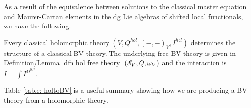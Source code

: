 \documentclass[11pt]{amsart}
\def\brian{\textcolor{blue}{BW: }\textcolor{blue}}
\begin{document}
As a result of the equivalence between solutions to the classical master equation and Maurer-Cartan elements in the dg Lie algebras of shifted local functionals, we have the following. 

\begin{prop} Every classical holomorphic theory $(V, Q^{hol},(-,-)_V, I^{hol})$ determines the structure of a classical BV theory.
The underlying free BV theory is given in Definition/Lemma \ref{dfn hol free theory} $(\mathscr E_V, Q, \omega_V)$ and the interaction is $I = \int I^{\Omega^{0,*}}$. 
\end{prop}

%


Table \ref{table: holtoBV} is a useful summary showing how we are producing a BV theory from a holomorphic theory.
\end{document}
